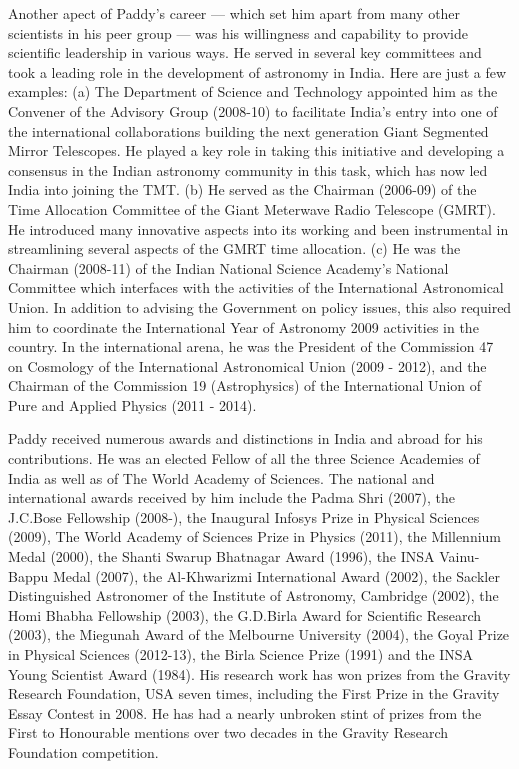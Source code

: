 \documentclass[prd, preprint, longbibliography, 12pt]{revtex4-2}
\begin{document}
Another apect of Paddy's career — which  set him apart from many other
scientists in his peer group — was his willingness and capability to
provide scientific leadership in various ways.
He served in several key committees and took a leading role in the
development of astronomy in India.
Here are just a few examples: (a) The Department of Science and
Technology appointed him as the Convener of the Advisory Group
(2008-10) to facilitate India’s entry into one of the international
collaborations building the next generation Giant Segmented Mirror
Telescopes. He played a key role in taking this initiative and
developing a consensus in the Indian astronomy community in this task,
which has now led India into joining the TMT. (b) He served as the
Chairman (2006-09) of the Time Allocation Committee of the Giant
Meterwave Radio Telescope (GMRT).  He introduced many innovative
aspects into its working and been instrumental in streamlining several
aspects of the GMRT time allocation. (c) He was the Chairman (2008-11)
of the Indian National Science Academy’s National Committee which
interfaces with the activities of the International Astronomical
Union. In addition to advising the Government on policy issues, this
also required him to coordinate the International Year of Astronomy
2009 activities in the country.
In the international arena, he was the President of the Commission 47
on Cosmology of the International Astronomical Union (2009 - 2012),
and the Chairman of the Commission 19 (Astrophysics) of the
International Union of Pure and Applied Physics (2011 - 2014).

Paddy received numerous awards and distinctions in
India and abroad for his contributions.
He was an elected Fellow of all the three Science Academies of India
as well as of The World Academy of Sciences. The national and
international awards received by him include the Padma Shri (2007),
the J.C.Bose Fellowship (2008-), the Inaugural Infosys Prize in
Physical Sciences (2009), The World Academy of Sciences Prize in
Physics (2011), the Millennium Medal (2000), the Shanti Swarup
Bhatnagar Award (1996), the INSA Vainu-Bappu Medal (2007), the
Al-Khwarizmi International Award (2002), the Sackler Distinguished
Astronomer of the  Institute of Astronomy, Cambridge (2002), the Homi
Bhabha Fellowship (2003), the G.D.Birla Award for Scientific Research
(2003), the Miegunah Award of the Melbourne University (2004), the
Goyal Prize in Physical Sciences (2012-13), the Birla Science Prize
(1991) and the INSA Young Scientist Award (1984).
His research work has won  prizes from the Gravity Research
Foundation, USA seven times, including the First Prize in the Gravity
Essay Contest in  2008.
He has had a nearly unbroken stint of prizes from the First to
Honourable mentions over two decades in the Gravity Research
Foundation competition. 
\end{document}
